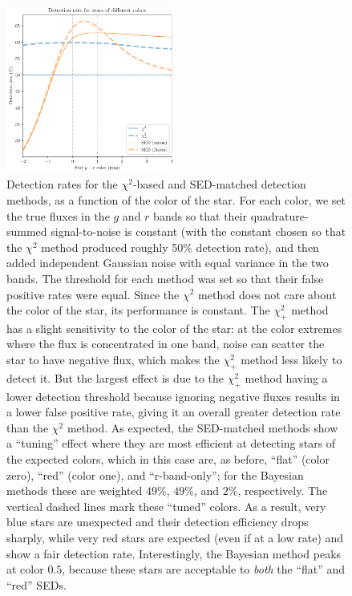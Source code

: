\documentclass[11pt,letterpaper,linenumbers]{aastex63}
\newcommand{\chipos}{\chi_+}
\begin{document}
\begin{figure}
  \begin{center}
    \includegraphics[width=0.49\textwidth]{chisq-pos-color}%
  \end{center}
  \caption{Detection rates for the $\chi^2$-based and SED-matched
    detection methods, as a function of the color of the star.  For
    each color, we set the true fluxes in the $g$ and $r$ bands so
    that their quadrature-summed signal-to-noise is constant (with the
    constant chosen so that the $\chi^2$ method produced roughly 50\%
    detection rate), and then added independent Gaussian noise with
    equal variance in the two bands.  The threshold for each method
    was set so that their false positive rates were equal.  Since the
    $\chi^2$ method does not care about the color of the star, its
    performance is constant.  The $\chipos^2$ method has a slight
    sensitivity to the color of the star: at the color extremes where
    the flux is concentrated in one band, noise can scatter the star
    to have negative flux, which makes the $\chipos^2$ method less
    likely to detect it.  But the largest effect is due to the
    $\chipos^2$ method having a lower detection threshold because
    ignoring negative fluxes results in a lower false positive rate, giving it an overall greater detection rate than the $\chi^2$ method.
    As expected, the SED-matched methods show a ``tuning'' effect
    where they are most efficient at detecting stars of the expected
    colors, which in this case are, as before, ``flat'' (color zero),
    ``red'' (color one), and ``r-band-only''; for the Bayesian methods
    these are weighted $49\%$, $49\%$, and $2\%$, respectively.  The vertical dashed lines mark these ``tuned'' colors.  As a
    result, very blue stars are unexpected and their detection
    efficiency drops sharply, while very red stars are expected (even
    if at a low rate) and show a fair detection rate.  Interestingly,
    the Bayesian method peaks at color $0.5$, because these stars are
    acceptable to \emph{both} the ``flat'' and ``red'' SEDs.
  \label{fig:chipos_colors}}
\end{figure}
\end{document}
